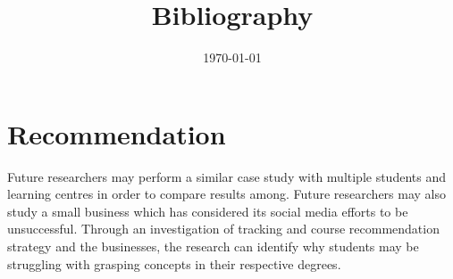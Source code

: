 \documentclass{article}
\begin{document}
\section{Recommendation}
Future researchers may perform a similar case study with multiple students and learning centres in order to compare results among. Future researchers may also study a small business which has considered its
social media efforts to be unsuccessful. Through an investigation of tracking and course recommendation strategy and the businesses, the research can identify why students may be struggling with grasping concepts in their respective degrees.

\title{Bibliography}
\author{}
\maketitle
\date{\today}



\end{document}
